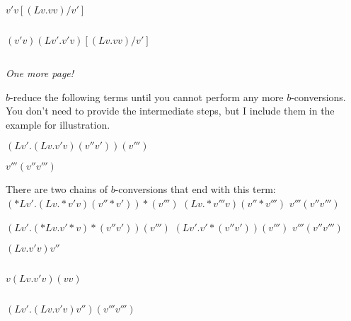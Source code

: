 	\answer
	$ $
	\endanswer

$ v'v[(Lv.vv)/v'] $

	\answer
	$ $
	\endanswer

$ (v'v)(Lv'.v'v)[(Lv.vv)/v'] $

	\answer
	$ $
	\endanswer

\endproblems

{\it One more page!}
\pagebreak

$ b$-reduce the following terms until you cannot perform any more $ b$-conversions. You don't need to provide the intermediate steps, but I include them in the example for illustration.

\problems
{}
$ (Lv'.(Lv.v'v)(v''v'))(v''') $

	\answer
	$ v'''(v''v''') $
	\endanswer

\bigskip
There are two chains of $ b$-conversions that end with this term:\medskip
$ (*{Lv'.}(Lv.*v'v)(v''*v'))*{(v''')} $  \cvs  $ (Lv.*{v'''}v)(v''*{v'''}) $  \cvs  $ v'''(v''v''') $

$ (Lv'.(*{Lv.}v'*v)*{(v''v')})(v''') $  \cvs  $ (Lv'.v'*{(v''v')})(v''') $  \cvs  $ v'''(v''v''') $

$ (Lv.v'v)v'' $

	\answer
	$ $
	\endanswer

$ v(Lv.v'v)(vv) $

	\answer
	$ $
	\endanswer

$ (Lv'.(Lv.v'v)v'')(v'''v''') $

	\answer
	$ $
	\endanswer

\endproblems
\bye
